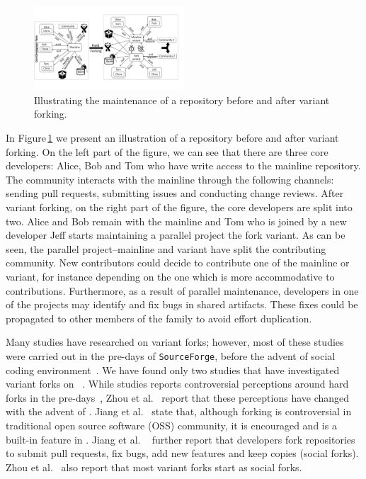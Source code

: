 \begin{figure}[ht]
  \begin{center}
  \small
  \vspace{-10pt}
    \includegraphics[width=0.5\textwidth]{figures/Collaboration.pdf}
  \end{center}
  \caption{Illustrating the maintenance of a repository before and after variant forking.}
  \vspace{-10pt}
  \label{fig:forking}
\end{figure}

In Figure\,\ref{fig:forking} we present an illustration of a repository before and after variant forking. 
On the left part of the figure, we can see that there are three core developers: Alice, Bob and Tom who have write access to the mainline repository. 
The community interacts with the mainline through the following channels: sending pull requests, submitting issues and conducting change reviews. 
After variant forking, on the right part of the figure, the core developers are split into two. 
Alice and Bob remain with the mainline and Tom who is joined by a new developer Jeff starts maintaining a parallel project the fork variant. 
As can be seen, the parallel project--mainline and variant have split the contributing community. New contributors could decide to contribute one of the mainline or variant, for instance depending on the one which is more accommodative to contributions.
Furthermore, as a result of parallel maintenance, developers in one of the projects may identify and fix bugs in shared artifacts. 
These fixes could be propagated to other members of the family to avoid effort duplication.

Many studies have researched on variant forks; however, most of these studies were carried out in the pre-\scp days of \texttt{SourceForge}, before the advent of social coding environment~\cite{Linus:2012Perspectives,Gregorio:2012,Viseur:2012Forks,Linus:2013CodeForking,Laurent:2008,Linus:2011ToFork}. 
We have found only two studies that have investigated variant forks on \gh~\cite{businge2018appfamilies,Zhou:2020}.  
While studies reports controversial perceptions around hard forks in the pre-\gh days~\cite{Chua:Forking:2017,Dixion:2009Forks,Ernst:2010,Linus:2011ToFork,Linus:2014Hackers,Raymond:Cathedral:2001}, Zhou et al.~\cite{Zhou:2020} report that these perceptions have changed with the advent of \gh. Jiang et al.~\cite{Lo:2017} state that, although forking is controversial in traditional open source software (OSS) community, it is encouraged and is a built-in feature in \gh. Jiang et al. ~\cite{Lo:2017} further report that developers fork repositories to submit pull requests, fix bugs, add new features and keep copies (social forks). 
Zhou et al.~\cite{Zhou:2020} also report that most variant forks start as social forks. 

